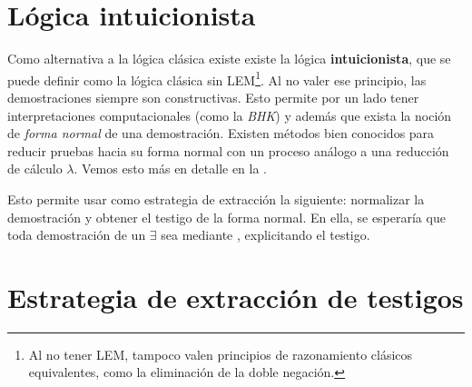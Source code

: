 \section{Lógica intuicionista}

Como alternativa a la lógica clásica existe existe la lógica
\textbf{intuicionista}, que se puede definir como la lógica clásica sin
LEM\footnote{Al no tener LEM, tampoco valen principios de razonamiento clásicos
equivalentes, como la eliminación de la doble negación.}. Al no valer ese
principio, las demostraciones siempre son constructivas. Esto permite por un
lado tener interpretaciones computacionales (como la \textit{BHK}) y además que
exista la noción de \textit{forma normal} de una demostración. Existen métodos
bien conocidos para reducir pruebas hacia su forma normal con un proceso análogo
a una reducción de cálculo $\lambda$. Vemos esto más en detalle en la .

Esto permite usar como estrategia de extracción la siguiente: normalizar la
demostración y obtener el testigo de la forma normal. En ella, se esperaría que
toda demostración de un $\exists$ sea mediante , explicitando el
testigo.

\section{Estrategia de extracción de testigos}

